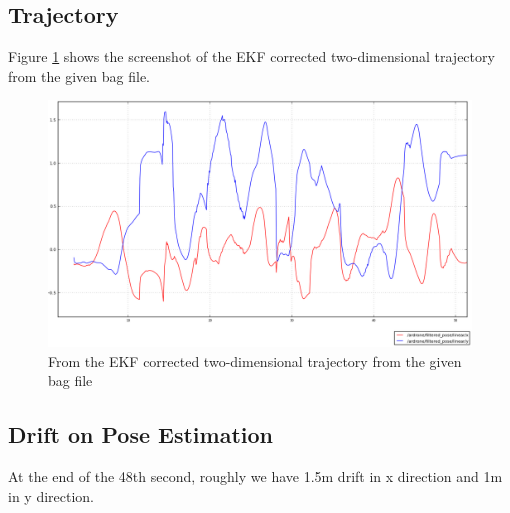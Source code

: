 \documentclass[14pt,a4paper]{article}
\begin{document}
	\subsection{Trajectory}
		Figure \ref{graph:filtered_pose_corrected} shows the screenshot of the EKF corrected two-dimensional trajectory from the given bag file.
	
	\begin{figure}[htbp]
	\centering
	\includegraphics[scale=0.4]{filtered_pose_corrected.png}
  	\caption{From the EKF corrected two-dimensional trajectory from the given bag file}
    \label{graph:filtered_pose_corrected}
	\end{figure}
		
	
	\subsection{Drift on Pose Estimation}
	
	At the end of the 48th second, roughly we have 1.5m drift in x direction and 1m in y direction.
\end{document}
